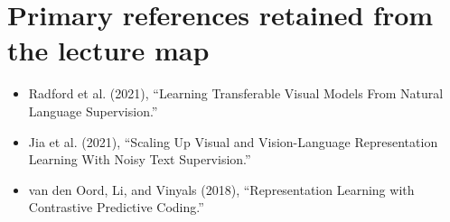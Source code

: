 \documentclass{article}
\begin{document}
\section{Primary references retained from the lecture map}

\begin{itemize}
  \item Radford et al. (2021), ``Learning Transferable Visual Models From Natural
  Language Supervision.''
  \item Jia et al. (2021), ``Scaling Up Visual and Vision-Language Representation
  Learning With Noisy Text Supervision.''
  \item van den Oord, Li, and Vinyals (2018), ``Representation Learning with
  Contrastive Predictive Coding.''
\end{itemize}
\end{document}
